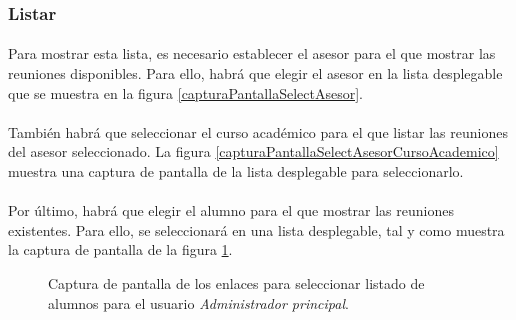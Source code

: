 \subsubsection{Listar}

  \paragraph{}Para mostrar esta lista, es necesario establecer el asesor para
  el que mostrar las reuniones disponibles. Para ello, habrá que elegir
  el asesor en la lista desplegable que se muestra en la figura
  \ref{capturaPantallaSelectAsesor}.

  \paragraph{}También habrá que seleccionar el curso académico para el que
  listar las reuniones del asesor seleccionado. La figura
  \ref{capturaPantallaSelectAsesorCursoAcademico} muestra una captura de
  pantalla de la lista desplegable para seleccionarlo.

  \paragraph{}Por último, habrá que elegir el alumno para el que mostrar las
  reuniones existentes. Para ello, se seleccionará en una lista desplegable,
  tal y como muestra la captura de pantalla de la figura
  \ref{capturaPantallaSelectAlumno}.

  \begin{figure}[!ht]
    \begin{center}
      \caption{Captura de pantalla de los enlaces para seleccionar listado de alumnos para el usuario \textit{Administrador principal}.}
      \label{capturaPantallaSelectAlumno}
    \end{center}
  \end{figure}

